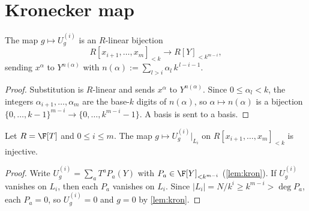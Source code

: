 \section{Kronecker map}

\setcounter{lemma}{0}\begin{lemma}\label{lem:kron}
The map $g\mapsto U^{(i)}_g$ is an $R$-linear bijection
\[
R[x_{i+1},\dots,x_m]_{<k}\longrightarrow R[Y]_{<k^{m-i}},
\]
sending $x^\alpha$ to $Y^{n(\alpha)}$ with $n(\alpha):=\sum_{l>i}\alpha_l\,k^{\,l-i-1}$.
\end{lemma}

\begin{proof}
Substitution is $R$-linear and sends $x^\alpha$ to $Y^{n(\alpha)}$. Since
$0\le\alpha_l<k$, the integers $\alpha_{i+1},\dots,\alpha_m$ are the base-$k$ digits of
$n(\alpha)$, so $\alpha\mapsto n(\alpha)$ is a bijection
$\{0,\dots,k-1\}^{m-i}\to\{0,\dots,k^{m-i}-1\}$. A basis is sent to a basis.
\end{proof}

{\renewcommand{\thelemma}{L1$'$}\begin{lemma}\label{lem:inj}
Let $R=\F[T]$ and $0\le i\le m$. The map
$g\mapsto U^{(i)}_g\big|_{L_i}$ on $R[x_{i+1},\dots,x_m]_{<k}$ is injective.
\end{lemma}

\begin{proof}
Write $U^{(i)}_g=\sum_a T^a P_a(Y)$ with $P_a\in\F[Y]_{<k^{m-i}}$ (\cref{lem:kron}).
If $U^{(i)}_g$ vanishes on $L_i$, then each $P_a$ vanishes on $L_i$. Since
$|L_i|=N/k^i\ge k^{m-i}>\deg P_a$, each $P_a=0$, so $U^{(i)}_g=0$ and $g=0$ by
\cref{lem:kron}.
\end{proof}}
